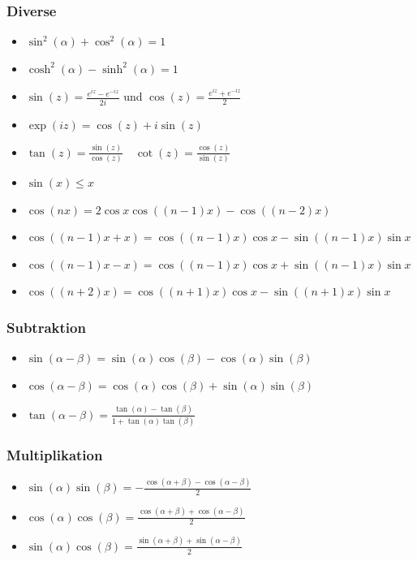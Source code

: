 \documentclass[a4paper,10pt]{article}
\begin{document}
    \subsubsection{Diverse}
    
    \begin{itemize}
        \item $\sin^2(\alpha) + \cos^2(\alpha) = 1$
        \item $\cosh^2(\alpha) - \sinh^2(\alpha) = 1$
        \item $\sin(z) = \frac{e^{iz} - e^{-iz}}{2i}$ und $\cos(z) = \frac{e^{iz} + e^{-iz}}{2}$
        \item $\exp (iz) = \cos(z) + i \sin(z)$
        \item $\tan(z)=\frac{\sin(z)}{\cos(z)}\quad \cot(z)=\frac{\cos(z)}{\sin(z)}$
        \item $\sin(x)\leq x$
        \item ${\displaystyle \cos(nx)=2\cos x\cos((n-1)x)-\cos((n-2)x)}$
        \item ${\displaystyle \cos((n-1)x+x)=\cos((n-1)x)\cos x-\sin((n-1)x)\sin x}$
        \item ${\displaystyle \cos((n-1)x-x)=\cos((n-1)x)\cos x+\sin((n-1)x)\sin x}$
        \item ${\displaystyle \cos((n+2)x)=\cos((n+1)x)\cos x-\sin((n+1)x)\sin x}$
    \end{itemize}
    
    \subsubsection{Subtraktion}
    \begin{itemize}
        \item $\sin(\alpha - \beta) = \sin(\alpha) \cos(\beta) - \cos(\alpha)\sin(\beta)$
        \item $\cos(\alpha - \beta) = \cos(\alpha) \cos(\beta) + \sin(\alpha)\sin(\beta)$
        \item $\tan(\alpha - \beta) = \frac{\tan(\alpha) - \tan(\beta)}{1+\tan(\alpha) \tan(\beta)}$
    \end{itemize}
    
    \subsubsection{Multiplikation}
    \begin{itemize}
        \item $\sin(\alpha) \sin(\beta) = -\frac{\cos(\alpha + \beta) - \cos(\alpha - \beta)}{2}$
        \item $\cos(\alpha) \cos(\beta) =  \frac{\cos(\alpha + \beta) + \cos(\alpha - \beta)}{2}$
        \item $\sin(\alpha) \cos(\beta) =  \frac{\sin(\alpha + \beta) + \sin(\alpha - \beta)}{2}$
    \end{itemize}
    
\end{document}
